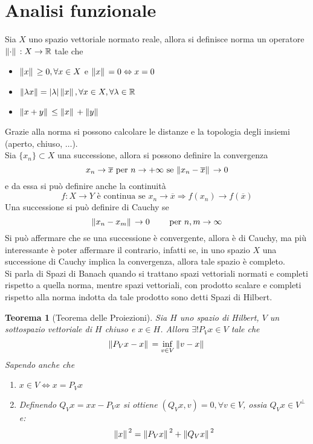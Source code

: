 \documentclass[a4paper,12pt, draft]{article}
\theoremstyle{break}
\newtheorem{theorem}{Teorema}[section]
\numberwithin{equation}{section}
\begin{document}
\section{Analisi funzionale}
Sia \(X\) uno spazio vettoriale normato reale, allora si definisce norma un operatore \(\norm*{\cdot}:X \to \mathbb{R}\) tale che 
\begin{itemize}
  \item \(\norm*{x} \geq 0, \forall x \in X\) e \(\norm*{x} = 0 \Leftrightarrow x = 0\)
  \item \(\norm{\lambda x} = \abs*{\lambda}\norm*{x}, \forall x \in X, \forall \lambda \in \mathbb{R}\)
  \item \(\norm*{x + y} \leq \norm*{x}+\norm*{y}\)
\end{itemize}
Grazie alla norma si possono calcolare le distanze e la topologia degli insiemi (aperto, chiuso, \(\ldots\)). \\
Sia \(\{x_n\} \subset X\) una successione, allora si possono definire la convergenza
\[
x_n \to \overline{x} \mbox{ per } n \to +\infty \mbox{ se }\norm*{x_n - \overline{x}} \to 0  
\] 
e da essa si può definire anche la continuità
\[
f: X \to Y \mbox{ è continua se } x_n \to \overline{x} \Rightarrow f(x_n) \to f(\overline{x})  
\]
Una successione si può definire di Cauchy se
\[
  \norm*{x_n - x_m} \to 0 \qquad \mbox{ per } n,m \to \infty
\]
Si può affermare che se una successione è convergente, allora è di Cauchy, ma più interessante è poter affermare il contrario, infatti se, in uno spazio \(X\) una successione di Cauchy implica la convergenza, allora tale spazio è completo. \\
Si parla di Spazi di Banach quando si trattano spazi vettoriali normati e completi rispetto a quella norma, mentre spazi vettoriali, con prodotto scalare e completi rispetto alla norma indotta da tale prodotto sono detti Spazi di Hilbert.
\begin{theorem}[Teorema delle Proiezioni]
  Sia \(H\) uno spazio di Hilbert, \(V\) un sottospazio vettoriale di \(H\) chiuso e \(x \in H\). Allora \(\exists! P_V x \in V\) tale che 
  \[
    \norm*{P_V x - x} = \inf_{v \in V} \norm*{v - x}
  \]
  Sapendo anche che 
  \begin{enumerate}
    \item \(x \in V \Leftrightarrow x = P_Vx\)
    \item Definendo \(Q_V x = x x- P_V x\) si ottiene \((Q_V x, v) = 0, \forall v \in V\), ossia \(Q_V x \in V^{\perp}\) e: \[\norm*{x}^2 = \norm*{P_V x}^2 + \norm*{Q_V x}^2\]
  \end{enumerate}
\end{theorem}
\end{document}
